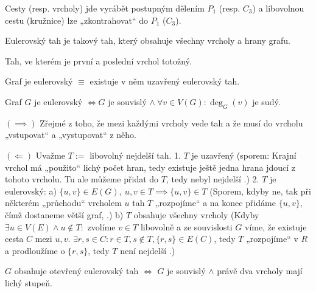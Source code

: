 \documentclass[12pt]{article}					%
\begin{document}
    \begin{poznamka}[Pozorování]
        Cesty (resp. vrcholy) jde vyrábět postupným dělením $P_1$ (resp. $C_3$) a libovolnou cestu (kružnice) lze „zkontrahovat“ do $P_1$ ($C_3$).
    \end{poznamka}


    \begin{definice}
        Eulerovský tah je takový tah, který obsahuje všechny vrcholy a hrany grafu.
    \end{definice}

    \begin{definice}
        Tah, ve kterém je první a poslední vrchol totožný.
    \end{definice}

    \begin{definice}
        Graf je eulerovský $≡$ existuje v něm uzavřený eulerovský tah.
    \end{definice}

    \begin{veta}
        Graf $G$ je eulerovský $\Leftrightarrow G$ je souvislý $\land\ \forall v \in V(G): \deg_G(v)$ je sudý.
        \begin{dukazin}
            $(\implies)$ Zřejmé z toho, že mezi každými vrcholy vede tah a že musí do vrcholu „vstupovat“ a „vystupovat“ z něho.

            $(\Leftarrow)$ Uvažme $T := $ libovolný nejdelší tah. 1. $T$ je uzavřený (sporem: Krajní vrchol má „použito“ lichý počet hran, tedy existuje ještě jedna hrana jdoucí z tohoto vrcholu. Tu ale můžeme přidat do $T$, tedy nebyl nejdelší \lightning.) 2. $T$ je eulerovský: a) $\{u, v\} \in E(G),\ u, v \in T \implies \{u, v\} \in T$ (Sporem, kdyby ne, tak při některém „průchodu“ vrcholem $u$ tah $T$ „rozpojíme“ a na konec přidáme $\{u, v\}$, čímž dostaneme větší graf, \lightning.) b) $T$ obsahuje všechny vrcholy (Kdyby $\exists u \in V(E) \land u \notin T:$ zvolíme $v \in T$ libovolně a ze souvislosti $G$ víme, že existuje cesta $C$ mezi $u, v$. $\exists r, s \in C: r\in T, s \notin T, \{r, s\}\in E(C)$, tedy $T$ „rozpojíme“ v $R$ a prodloužíme o $\{r, s\}$, tedy $T$ není nejdelší \lightning.)
        \end{dukazin}
    \end{veta}

    \begin{priklad}
        $G$ obsahuje otevřený eulerovský tah $\Leftrightarrow$ $G$ je souvislý $\land$ právě dva vrcholy mají lichý stupeň.
    \end{priklad}
\end{document}
